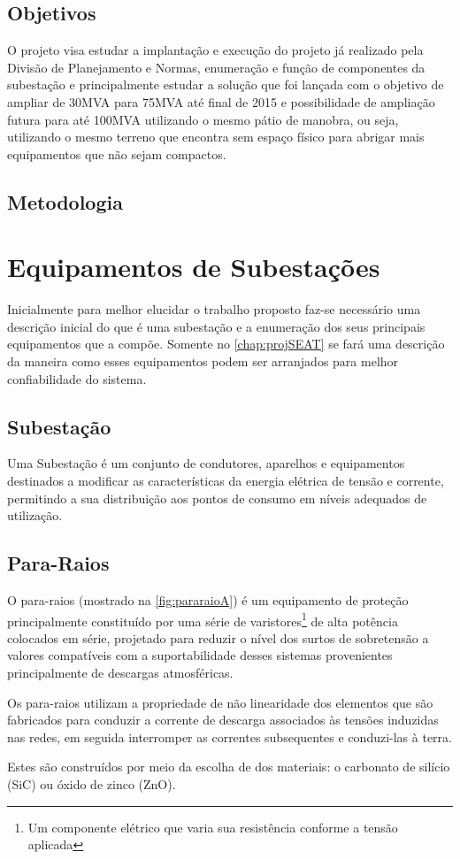 \documentclass[a5paper,english,spanish,brazil]{ufsc-thesis}
\begin{document}
\section{Objetivos}
O projeto visa estudar a implantação e execução do projeto já realizado pela Divisão de Planejamento e Normas, enumeração e função de componentes da subestação e principalmente estudar a solução que foi lançada com o objetivo de ampliar de 30MVA para 75MVA até final de 2015 e possibilidade de ampliação futura para até 100MVA utilizando o mesmo pátio de manobra, ou seja, utilizando o mesmo terreno que encontra sem espaço físico para abrigar mais equipamentos que não sejam compactos.

\section{Metodologia}
\lipsum[1]


\chapter{Equipamentos de Subestações}
\label{chap:equipSE}
Inicialmente para melhor elucidar o trabalho proposto faz-se necessário uma descrição inicial do que é uma subestação e a enumeração dos seus principais equipamentos que a compõe. Somente no \autoref{chap:projSEAT} se fará uma descrição da maneira como esses equipamentos podem ser arranjados para melhor confiabilidade do sistema.
\section*{Subestação}
Uma Subestação é um conjunto de condutores, aparelhos e equipamentos destinados a modificar as características da energia elétrica de tensão e corrente, permitindo a sua distribuição aos pontos de consumo em níveis adequados de utilização.\cite{instElet}

\section{Para-Raios}
O para-raios (mostrado na \autoref{fig:pararaioA}) é um equipamento de proteção principalmente constituído por uma série de varistores\footnote{Um componente elétrico que varia sua resistência conforme a tensão aplicada\cite[p. 413]{BellSytemHistory}} de alta potência colocados em série, projetado para reduzir o nível dos surtos de sobretensão a valores compatíveis com a suportabilidade desses sistemas provenientes principalmente de descargas atmosféricas.\par
Os para-raios utilizam a propriedade de não linearidade dos elementos que são fabricados para conduzir a corrente de descarga associados às tensões induzidas nas redes, em seguida interromper as correntes subsequentes e conduzi-las à terra.\par
Estes são construídos por meio da escolha de dos materiais: o carbonato de silício (SiC) ou óxido de zinco (ZnO). 
\end{document}
